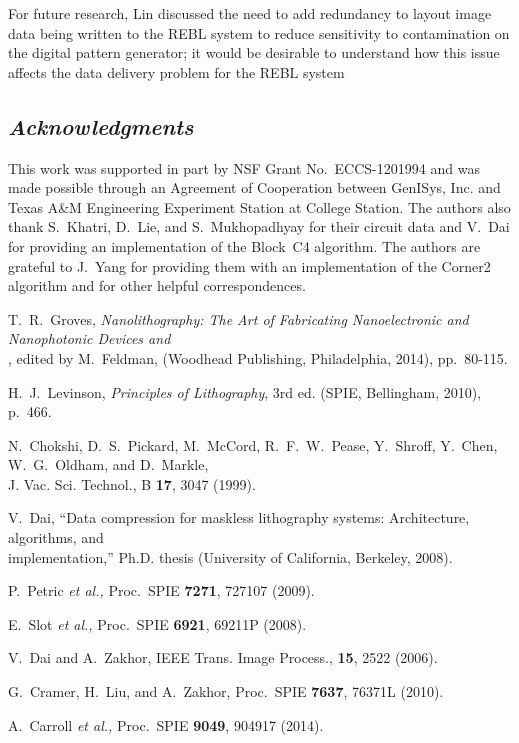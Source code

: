 \documentclass{article}
\begin{document}
For future research, Lin discussed the need
to add redundancy to layout image data being written to the REBL system
to reduce sensitivity to contamination on the digital pattern generator;
it would be desirable to understand how this issue affects the data delivery
problem for the REBL system

\subsection*{{\em Acknowledgments}}
This work was supported in part by NSF Grant No.~ECCS-1201994
and was made possible through an Agreement of
Cooperation between GenISys, Inc. and Texas A\&M Engineering Experiment
Station at College Station.  The authors also thank S.~Khatri, D.~Lie, and
S.~Mukhopadhyay for their circuit data and V.~Dai for providing an
implementation of the Block~C4 algorithm.  The authors are grateful to
J.~Yang for providing them with an implementation of the Corner2 algorithm
and for other helpful correspondences.

\noindent T.~R.~Groves, {\em Nanolithography: The Art of Fabricating 
Nanoelectronic and Nanophotonic Devices and} \\
, edited by
M.~Feldman, (Woodhead Publishing, Philadelphia, 2014), pp.~80-115.

\noindent H.~J.~Levinson, {\em Principles of Lithography}, 3rd ed.
(SPIE, Bellingham, 2010), p.~466.

\noindent N.~Chokshi, D.~S.~Pickard, M.~McCord, R.~F.~W.~Pease, Y.~Shroff,
Y.~Chen, W.~G.~Oldham, and D.~Markle, \\
\indent J. Vac. Sci. Technol., B {\bf 17}, 3047 (1999).

\noindent V.~Dai, ``Data compression for maskless lithography systems: Architecture, algorithms, and \\
\indent implementation,'' Ph.D. thesis (University of California, Berkeley, 
2008).

\noindent P.~Petric \emph{et al.,} Proc.~SPIE {\bf 7271}, 727107 (2009).

\noindent E.~Slot \emph{et al.,} Proc.~SPIE {\bf 6921}, 69211P (2008).

\noindent V.~Dai and A.~Zakhor, 
IEEE Trans. Image Process., {\bf 15}, 2522 (2006).

\noindent G.~Cramer, H.~Liu, and A.~Zakhor,
Proc.~SPIE {\bf 7637}, 76371L (2010).

\noindent A.~Carroll \emph{et al.,} Proc.~SPIE {\bf 9049}, 904917 (2014).
\end{document}
